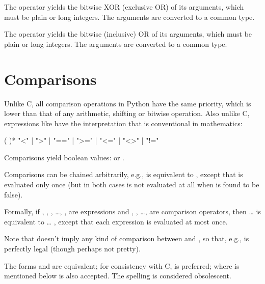 The \code{\^} operator yields the bitwise XOR (exclusive OR) of its
arguments, which must be plain or long integers.  The arguments are
converted to a common type.

The \code{|} operator yields the bitwise (inclusive) OR of its
arguments, which must be plain or long integers.  The arguments are
converted to a common type.


\section{Comparisons\label{comparisons}}

Unlike C, all comparison operations in Python have the same priority,
which is lower than that of any arithmetic, shifting or bitwise
operation.  Also unlike C, expressions like  have the
interpretation that is conventional in mathematics:

\begin{productionlist}
             { (   )*}
             {"<" | ">" | "==" | ">=" | "<=" | "<>" | "!="}
\end{productionlist}

Comparisons yield boolean values:  or .

Comparisons can be chained arbitrarily, e.g.,  is
equivalent to , except that  is
evaluated only once (but in both cases  is not evaluated at all
when  is found to be false).

Formally, if , , , \ldots, ,  are
expressions and , , \ldots,  are comparison
operators, then  \ldots {} is equivalent
to     \ldots
{}, except that each expression is evaluated at most once.

Note that  doesn't imply any kind of comparison
between  and , so that, e.g.,  is
perfectly legal (though perhaps not pretty).

The forms \code{<>} and \code{!=} are equivalent; for consistency with
C, \code{!=} is preferred; where \code{!=} is mentioned below
\code{<>} is also accepted.  The \code{<>} spelling is considered
obsolescent.

